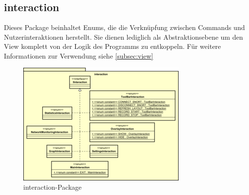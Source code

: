 \subsection{interaction}
\label{subsec:interaction}

Dieses Package beinhaltet Enums, die die Verknüpfung zwischen Commands und Nutzerinteraktionen herstellt. Sie dienen lediglich als Abstraktionsebene um den View komplett von der Logik des Programms zu entkoppeln.
Für weitere Informationen zur Verwendung siehe \ref{subsec:view}

\begin{figure}[H]
  \centering
  \includegraphics[width=\textwidth]{../diagramimages/interaction.png}
  \caption{interaction-Package}
\end{figure} 